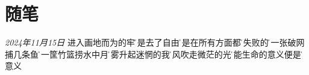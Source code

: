 \section*{随笔}
\begin{center}
\textit{2024年11月15日}\hh
进入画地而为的牢\h
便是去了自由\h
于是在所有方面都\h
是失败的\h
用一张破网捕几条鱼\h
使一筐竹篮捞水中月\h
迷雾升起迷惘的我\h
微风吹走微茫的光\h
可能生命的意义便是\h
没意义
\end{center}